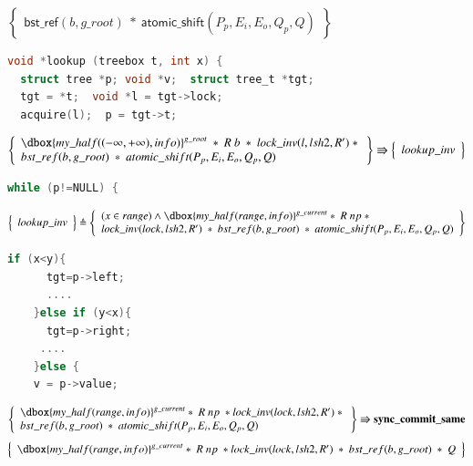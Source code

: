 \documentclass[a4paper,USenglish,cleveref, autoref, thm-restate]{lipics-v2021}
\newcommand\dboxed[1]{\dbox{\ensuremath{#1}}}
\newcommand{\ghost}[2]{\ensuremath{\dboxed{#1}^{#2}}}
\newcommand{\nodeboxrep}{\ensuremath{\mathsf{bst\_ref}}}
\begin{document}
\begin{figure}[htp]
\begin{subfigure}[t]{1\textwidth}
 $$\left\{\begin{array}{l} \nodeboxrep(b,g\_root)\ *\ \mathsf{atomic\_shift}(P_p,E_i,E_o,Q_p,Q)\end{array}\right\}$$
\begin{lstlisting}[language = C,  numbers = none]
void *lookup (treebox t, int x) {
  struct tree *p; void *v;  struct tree_t *tgt;
  tgt = *t;  void *l = tgt->lock;
  acquire(l);  p = tgt->t;
 \end{lstlisting}  
 $$\left\{\begin{array}{l} \ghost{\mathsf{my\_half}((-\infty,+\infty),info)}{g\_root}\ *\ R\ b\ *\ \mathsf{lock\_inv}(l,lsh2,R')\ *\ \\
 \nodeboxrep(b,g\_root)\ *\ \mathsf{atomic\_shift}(P_p,E_i,E_o,Q_p,Q)\end{array}\right\} \Rrightarrow \left\{\begin{array}{l} lookup\_inv \end{array}\right\}$$ 
  \begin{lstlisting}[language = C, numbers = none]
    while (p!=NULL) {
       \end{lstlisting}   
   $$\left\{\begin{array}{l} lookup\_inv \end{array}\right\} \triangleq \left\{\begin{array}{l}(x\in range)\land \ghost{\mathsf{my\_half}(range,info)}{g\_current}*\ R\ np\ *\\\mathsf{lock\_inv}(lock,lsh2,R')\ *\ \nodeboxrep(b,g\_root)\ *\ \mathsf{atomic\_shift}(P_p,E_i,E_o,Q_p,Q)\end{array}\right\}$$
      \begin{lstlisting}[language = C,  numbers = none]
    if (x<y){
      tgt=p->left;
      ....
    }else if (y<x){
      tgt=p->right;
     ....
    }else {
    v = p->value;
           \end{lstlisting} 
  $$\left\{\begin{array}{l} \ghost{\mathsf{my\_half}(range,info)}{g\_current}*\ R\ np\ *\mathsf{lock\_inv}(lock,lsh2,R')\ *\ \\\nodeboxrep(b,g\_root)\ *\ \mathsf{atomic\_shift}(P_p,E_i,E_o,Q_p,Q)\end{array}\right\} \Rrightarrow{\textbf{sync\_commit\_same}}$$
$$\left\{\begin{array}{l} \ghost{\mathsf{my\_half}(range,info)}{g\_current}*\ R\ np\ *\mathsf{lock\_inv}(lock,lsh2,R')\ *\ \nodeboxrep(b,g\_root)\ *\ Q\end{array}\right\}$$

\end{subfigure}
\end{figure}
\end{document}
